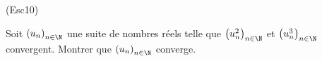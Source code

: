 \begin{tiny}(Esc10)\end{tiny} Soit $\left( u_n\right) _{n\in \N}$ une suite de nombres réels telle que $\left( u_n^2\right) _{n\in \N}$ et $\left( u_n^3\right) _{n\in \N}$ convergent. Montrer que $\left( u_n\right) _{n\in \N}$ converge.